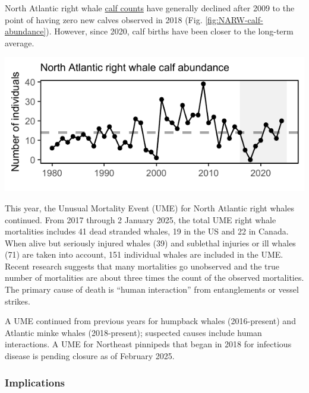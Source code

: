 \documentclass[
  10pt,
]{article}
\let\origfigure\figure
\let\endorigfigure\endfigure
\renewenvironment{figure}[1][2] {
    \expandafter\origfigure\expandafter[H]
} {
    \endorigfigure
}
\begin{document}
North Atlantic right whale \href{https://noaa-edab.github.io/catalog/narw.html}{calf counts} have generally declined after 2009 to the point of having zero new calves observed in 2018 (Fig. \ref{fig:NARW-calf-abundance}). However, since 2020, calf births have been closer to the long-term average.

\begin{figure}

{\centering \includegraphics{midatlantic_files/figure-latex/NARW-calf-abundance-1} 

}

\caption{Number of North Atlantic right whale calf births, 1990 - 2022.}\label{fig:NARW-calf-abundance}
\end{figure}

This year, the Unusual Mortality Event (UME) for North Atlantic right whales continued. From 2017 through 2 January 2025, the total UME right whale mortalities includes 41 dead stranded whales, 19 in the US and 22 in Canada. When alive but seriously injured whales (39) and sublethal injuries or ill whales (71) are taken into account, 151 individual whales are included in the UME. Recent research suggests that many mortalities go unobserved and the true number of mortalities are about three times the count of the observed mortalities. The primary cause of death is ``human interaction'' from entanglements or vessel strikes.

A UME continued from previous years for humpback whales (2016-present) and Atlantic minke whales (2018-present); suspected causes include human interactions. A UME for Northeast pinnipeds that began in 2018 for infectious disease is pending closure as of February 2025.

\subsubsection{Implications}\label{implications-5}
\end{document}
